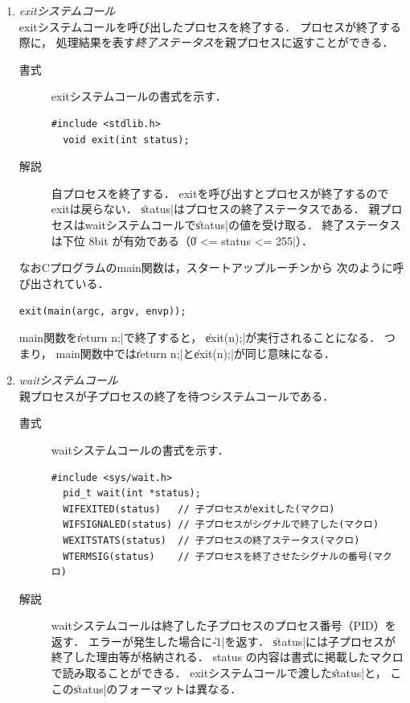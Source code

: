 \begin{enumerate}
\item \emph{exitシステムコール} \\
  exitシステムコールを呼び出したプロセスを終了する．
  プロセスが終了する際に，
  処理結果を表す\emph{終了ステータス}を親プロセスに返すことができる．

  \begin{description}
  \item[書式] exitシステムコールの書式を示す．
\begin{lstlisting}[numbers=none]
  #include <stdlib.h>
  void exit(int status);
\end{lstlisting}

  \item[解説] 自プロセスを終了する．
    exitを呼び出すとプロセスが終了するのでexitは戻らない．
    \|status|はプロセスの終了ステータスである．
    親プロセスはwaitシステムコールで\|status|の値を受け取る．
    終了ステータスは下位 8bit が有効である（\|0 <= status <= 255|）．
  \end{description}

  なおCプログラムのmain関数は，スタートアップルーチンから
  次のように呼び出されている．

  \centerline{\texttt{exit(main(argc, argv, envp));}}

  main関数を\|return n;|で終了すると，
  \|exit(n);|が実行されることになる．
  つまり，
  main関数中では\|return n;|と\|exit(n);|が同じ意味になる．

\item \emph{waitシステムコール} \\
  親プロセスが子プロセスの終了を待つシステムコールである．
  \begin{description}
  \item[書式] waitシステムコールの書式を示す．

\begin{lstlisting}[numbers=none]
  #include <sys/wait.h>
  pid_t wait(int *status);
  WIFEXITED(status)   // 子プロセスがexitした(マクロ)
  WIFSIGNALED(status) // 子プロセスがシグナルで終了した(マクロ)
  WEXITSTATS(status)  // 子プロセスの終了ステータス(マクロ)
  WTERMSIG(status)    // 子プロセスを終了させたシグナルの番号(マクロ)
\end{lstlisting}

  \item[解説] 
    waitシステムコールは終了した子プロセスのプロセス番号（PID）を返す．
    エラーが発生した場合に\|-1|を返す．
    \|status|には子プロセスが終了した理由等が格納される．
    status の内容は書式に掲載したマクロで読み取ることができる．
    exitシステムコールで渡した\|status|と，
    ここの\|status|のフォーマットは異なる．
  \end{description}
\end{enumerate}

